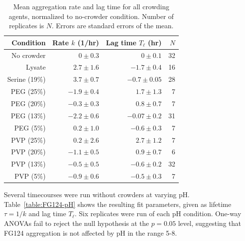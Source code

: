 

\begin{table}[b!]
\centering
  \caption[Aggregation rate and lag time for all crowding agents.]{Mean aggregation rate and lag time for all crowding agents, normalized to no-crowder condition. Number of replicates is $N$. Errors are standard errors of the mean.}
    \label{table:crowder-params}
    \begin{tabular}{r |r |r| r}%
       Condition & Rate $k$ (1/hr) & Lag time $T_\ell$ (hr)  & $N$ \\
      \hline
	No crowder & $0\pm0.3$ & $0\pm0.1$& 32\\
	Lysate & $2.7\pm1.6$  & $-1.7\pm0.4 $ & 16 \\
     	Serine (19\%)& $3.7\pm0.7$  & $-0.7\pm0.05  $& 28 \\
      	PEG (25\%) & $-1.9\pm0.4$  & $1.7\pm1.3  $ & 7 \\
     	PEG (20\%) & $-0.3\pm0.3$   & $0.8\pm0.7$  & 7 \\
	PEG (13\%) & $-2.2\pm 0.6$ & $-0.07\pm 0.2 $ & 31 \\
	PEG (5\%) & $0.2\pm1.0$  & $-0.6\pm0.3 $ & 7 \\
      	PVP (25\%) & $0.2\pm2.6$  & $2.7\pm1.2 $  & 7 \\
     	PVP (20\%) & $-1.1\pm0.5$  & $0.9\pm0.7$   & 6\\
	PVP (13\%) & $-0.5\pm0.5$  & $-0.6\pm0.2 $ & 32\\
	PVP (5\%) & $-0.9\pm0.6$  & $-0.5\pm0.3$   & 7 \\
    \end{tabular}
\end{table}

Several timecourses were run without crowders at varying pH.  Table~\ref{table:FG124-pH} shows the resulting fit parameters, given as lifetime $\tau = 1/k$ and lag time $T_\ell$.  Six replicates were run of each pH condition.  One-way ANOVAs fail to reject the null hypothesis at the $p=0.05$ level, suggesting that FG124 aggregation is not affected by pH in the range 5-8.

